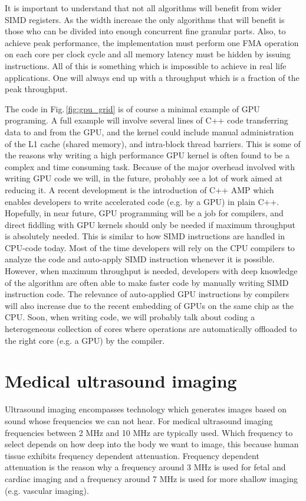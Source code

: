 It is important to understand that not all algorithms will benefit from wider SIMD registers. As the width increase the only algorithms that will benefit is those who can be divided into enough concurrent fine granular parts. Also, to achieve peak performance, the implementation must perform one FMA operation on each core per clock cycle and all memory latency must be hidden by issuing instructions. All of this is something which is impossible to achieve in real life applications. One will always end up with a throughput which is a fraction of the peak throughput.

The code in Fig.\,\ref{fig:gpu_grid} is of course a minimal example of GPU programing. A full example will involve several lines of C++ code transferring data to and from the GPU, and the kernel could include manual administration of the L1 cache (shared memory), and intra-block thread barriers. This is some of the reasons why writing a high performance GPU kernel is often found to be a complex and time consuming task. Because of the major overhead involved with writing GPU code we will, in the future, probably see a lot of work aimed at reducing it.  A recent development is the introduction of C++ AMP which enables developers to write accelerated code (e.g. by a GPU) in plain C++. Hopefully, in near future, GPU programming will be a job for compilers, and direct fiddling with GPU kernels should only be needed if maximum throughput is absolutely needed. This is similar to how SIMD instructions are handled in CPU-code today. Most of the time developers will rely on the CPU compilers to analyze the code and auto-apply SIMD instruction whenever it is possible. However, when maximum throughput is needed, developers with deep knowledge of the algorithm are often able to make faster code by manually writing SIMD instruction code. The relevance of auto-applied GPU instructions by compilers will also increase due to the recent embedding of GPUs on the same chip as the CPU. Soon, when writing code, we will probably talk about coding a heterogeneous collection of cores where operations are automatically offloaded to the right core (e.g. a GPU) by the compiler.

\section {Medical ultrasound imaging}\label{sec:ultrasound}
Ultrasound imaging encompasses technology which generates images based on sound whose frequencies we can not hear. For medical ultrasound imaging frequencies between 2 MHz and 10 MHz are typically used. Which frequency to select depends on how deep into the body we want to image, this because human tissue exhibits frequency dependent attenuation. Frequency dependent attenuation is the reason why a frequency around 3 MHz is used for fetal and cardiac imaging and a frequency around 7 MHz is used for more shallow imaging (e.g. vascular imaging). 

